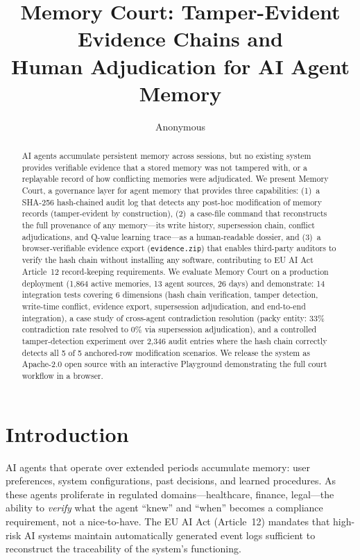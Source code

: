 \documentclass{article}
\title{Memory Court: Tamper-Evident Evidence Chains and\\ Human Adjudication for AI Agent Memory}
\author{Anonymous}
\date{}
\begin{document}
\maketitle

\begin{abstract}
AI agents accumulate persistent memory across sessions, but no existing system provides verifiable evidence that a stored memory was not tampered with, or a replayable record of how conflicting memories were adjudicated. We present Memory Court, a governance layer for agent memory that provides three capabilities: (1)~a SHA-256 hash-chained audit log that detects any post-hoc modification of memory records (tamper-evident by construction), (2)~a case-file command that reconstructs the full provenance of any memory---its write history, supersession chain, conflict adjudications, and Q-value learning trace---as a human-readable dossier, and (3)~a browser-verifiable evidence export (\texttt{evidence.zip}) that enables third-party auditors to verify the hash chain without installing any software, contributing to EU AI Act Article~12 record-keeping requirements. We evaluate Memory Court on a production deployment (1{,}864 active memories, 13 agent sources, 26 days) and demonstrate: 14 integration tests covering 6 dimensions (hash chain verification, tamper detection, write-time conflict, evidence export, supersession adjudication, and end-to-end integration), a case study of cross-agent contradiction resolution (packy entity: 33\% contradiction rate resolved to 0\% via supersession adjudication), and a controlled tamper-detection experiment over 2{,}346 audit entries where the hash chain correctly detects all 5 of 5 anchored-row modification scenarios. We release the system as Apache-2.0 open source with an interactive Playground demonstrating the full court workflow in a browser.
\end{abstract}

\section{Introduction}

AI agents that operate over extended periods accumulate memory: user preferences, system configurations, past decisions, and learned procedures. As these agents proliferate in regulated domains---healthcare, finance, legal---the ability to \emph{verify} what the agent ``knew'' and ``when'' becomes a compliance requirement, not a nice-to-have. The EU AI Act (Article~12) mandates that high-risk AI systems maintain automatically generated event logs sufficient to reconstruct the traceability of the system's functioning.
\end{document}
